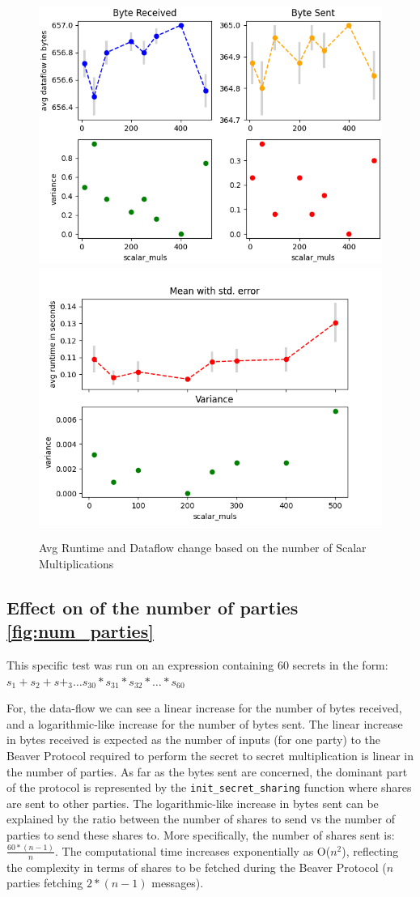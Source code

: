 \documentclass[10pt,conference,compsocconf]{IEEEtran}
\begin{document}
\begin{figure}[h!]
    \centering
    \includegraphics[width=0.49\linewidth]{../performance_analysis/dataflow_scalar_multiplications.png}
    \includegraphics[width=0.49\linewidth]{../performance_analysis/runtime_scalar_multiplications.png}
    \caption{Avg Runtime and Dataflow change based on the number of Scalar Multiplications}
    \label{fig:scalar_mult}
\end{figure}


\subsection{Effect on of the number of parties \ref{fig:num_parties}}
This specific test was run on an expression containing 60 secrets in the form: $s_1 + s_2 + s+_3 \dots s_{30} * s_{31} *
s_{32} * \dots*  s_{60}$

For, the data-flow we can see a linear increase for the number of bytes received, and a logarithmic-like increase for the
number of bytes sent.
The linear increase in bytes received is expected as the number of inputs (for one party) to the Beaver Protocol required to perform the secret to secret multiplication is linear in the number of parties.
As far as the bytes sent are concerned, the dominant part of the protocol is represented by the \texttt{init\_secret\_sharing} function where shares are sent to other parties.
The logarithmic-like increase in bytes sent can be explained by the ratio between the number of shares to send vs the
number of parties to send these shares to.
More specifically, the number of shares sent is: $\frac{60*(n-1)}{n}$.
The computational time increases exponentially as O($n^2$), reflecting the complexity in terms of shares to be fetched during the Beaver Protocol ($n$ parties fetching $2*(n-1)$ messages).
\end{document}
